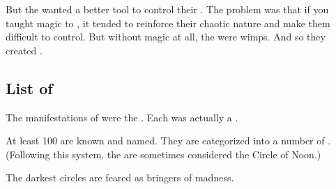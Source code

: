 
But the \banes{} wanted a better tool to control their \humans{}. The problem was that if you taught \itzach{} magic to \humans{}, it tended to reinforce their chaotic nature and make them difficult to control. But without magic at all, the \humans{} were wimps. 
And so they created . 








\subsection{List of \Qliphoth}
The manifestations of \itzach were the . 
Each \qliphah was actually a \banelord. 

At least 100 \qliphoth{} are known and named. 
They are categorized into a number of . 
(Following this system, the  are sometimes considered the Circle of Noon.) 

The darkest circles are feared as bringers of madness.






